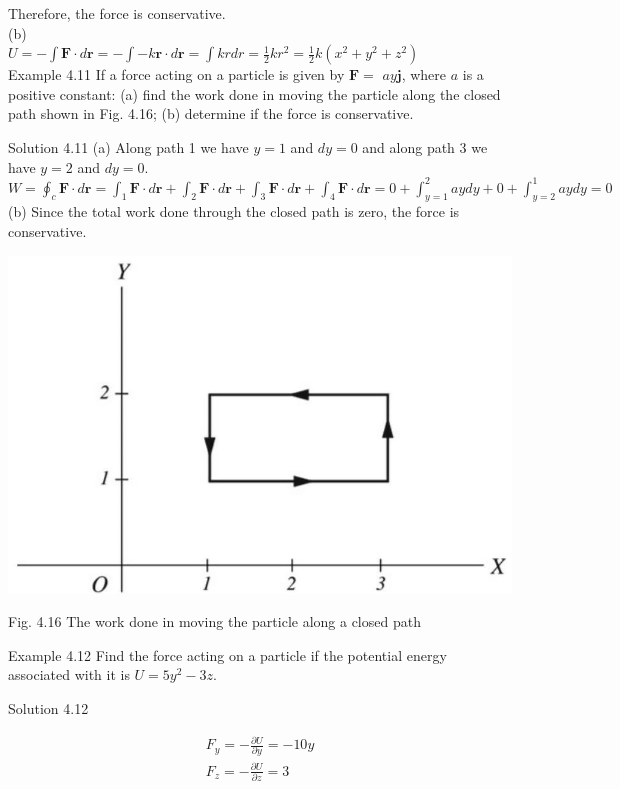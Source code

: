 \documentclass[10pt]{article}
\begin{document}
Therefore, the force is conservative.\\
(b)\\
$U=-\int \mathbf{F} \cdot d \mathbf{r}=-\int-k \mathbf{r} \cdot d \mathbf{r}=\int k r d r=\frac{1}{2} k r^{2}=\frac{1}{2} k\left(x^{2}+y^{2}+z^{2}\right)$\\
Example 4.11 If a force acting on a particle is given by $\mathbf{F}=$ $a y \mathbf{j}$, where $a$ is a positive constant: (a) find the work done in moving the particle along the closed path shown in Fig. 4.16; (b) determine if the force is conservative.

Solution 4.11 (a) Along path 1 we have $y=1$ and $d y=0$ and along path 3 we have $y=2$ and $d y=0$.\\
$W=\oint_{c} \mathbf{F} \cdot d \mathbf{r}=\int_{1} \mathbf{F} \cdot d \mathbf{r}+\int_{2} \mathbf{F} \cdot d \mathbf{r}+\int_{3} \mathbf{F} \cdot d \mathbf{r}+\int_{4} \mathbf{F} \cdot d \mathbf{r}=0+\int_{y=1}^{2} a y d y+0+\int_{y=2}^{1} a y d y=0$\\
(b) Since the total work done through the closed path is zero, the force is conservative.

\begin{center}
\includegraphics[max width=\textwidth]{2024_09_13_db1f357d2aad0a03eb2eg-070}
\end{center}

Fig. 4.16 The work done in moving the particle along a closed path

Example 4.12 Find the force acting on a particle if the potential energy associated with it is $U=5 y^{2}-3 z$.

Solution 4.12

$$
\begin{gathered}
F_{y}=-\frac{\partial U}{\partial y}=-10 y \\
F_{z}=-\frac{\partial U}{\partial z}=3
\end{gathered}
$$
\end{document}

